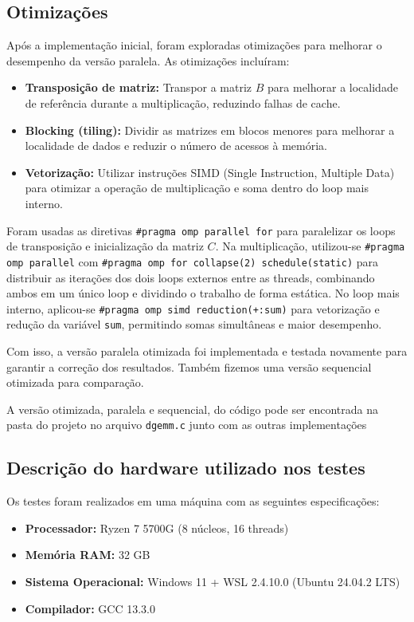 \documentclass[12pt, a4paper]{article}
\begin{document}
	\subsection{Otimizações}

	Após a implementação inicial, foram exploradas otimizações para melhorar o desempenho
	da versão paralela. As otimizações incluíram:
	\begin{itemize}
		\item \textbf{Transposição de matriz:} Transpor a matriz $B$ para melhorar a localidade de referência
		durante a multiplicação, reduzindo falhas de cache.

		\item \textbf{Blocking (tiling):} Dividir as matrizes em blocos menores para melhorar a localidade de dados
		e reduzir o número de acessos à memória.

		\item \textbf{Vetorização:} Utilizar instruções SIMD (Single Instruction, Multiple Data) para otimizar a operação
		de multiplicação e soma dentro do loop mais interno.
	\end{itemize}

	Foram usadas as diretivas \texttt{\#pragma omp parallel for} para paralelizar os loops de transposição e inicialização da matriz $C$. Na multiplicação, utilizou-se \texttt{\#pragma omp parallel} com \texttt{\#pragma omp for collapse(2) schedule(static)} para distribuir as iterações dos dois loops externos entre as threads, combinando ambos em um único loop e dividindo o trabalho de forma estática. No loop mais interno, aplicou-se \texttt{\#pragma omp simd reduction(+:sum)} para vetorização e redução da variável \texttt{sum}, permitindo somas simultâneas e maior desempenho.

	Com isso, a versão paralela otimizada foi implementada e testada novamente para garantir a correção dos resultados. Também fizemos uma versão sequencial otimizada para comparação.

	A versão otimizada, paralela e sequencial, do código pode ser encontrada na pasta do projeto no arquivo \texttt{dgemm.c} junto com as outras implementações

    \subsection{Descrição do hardware utilizado nos testes}

    Os testes foram realizados em uma máquina com as seguintes especificações:
    \begin{itemize}
        \item \textbf{Processador:} Ryzen 7 5700G (8 núcleos, 16 threads)
        \item \textbf{Memória RAM:} 32 GB
        \item \textbf{Sistema Operacional:} Windows 11 + WSL 2.4.10.0 (Ubuntu 24.04.2 LTS)
        \item \textbf{Compilador:} GCC 13.3.0
    \end{itemize}
\end{document}
